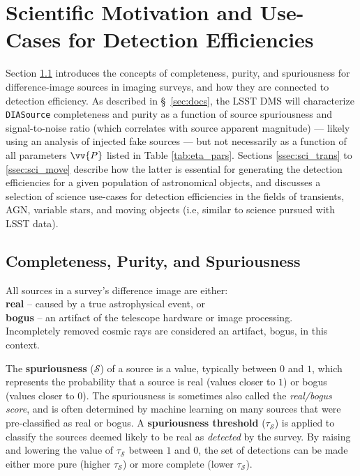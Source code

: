 \documentclass[DM,lsstdraft,toc]{lsstdoc}
\begin{document}
\section{Scientific Motivation and Use-Cases for Detection Efficiencies}\label{sec:sci}

Section \ref{ssec:sci_rb} introduces the concepts of completeness, purity, and spuriousness for difference-image sources in imaging surveys, and how they are connected to detection efficiency. As described in \S~\ref{sec:docs}, the LSST DMS will characterize {\tt DIASource} completeness and purity as a function of source spuriousness and signal-to-noise ratio (which correlates with source apparent magnitude) --- likely using an analysis of injected fake sources --- but not necessarily as a function of all parameters $\vv{P}$ listed in Table \ref{tab:eta_pars}. Sections \ref{ssec:sci_trans} to \ref{ssec:sci_move} describe how the latter is essential for generating the detection efficiencies for a given population of astronomical objects, and discusses a selection of science use-cases for detection efficiencies in the fields of transients, AGN, variable stars, and moving objects (i.e, similar to science pursued with LSST data). 

\subsection{Completeness, Purity, and Spuriousness}\label{ssec:sci_rb}

All sources in a survey's difference image are either: \\
\hspace*{10mm} {\bf real} -- caused by a true astrophysical event, or \\
\hspace*{10mm} {\bf bogus} -- an artifact of the telescope hardware or image processing. \\ 
Incompletely removed cosmic rays are considered an artifact, bogus, in this context. 

The {\bf spuriousness} ($\mathcal{S}$) of a source is a value, typically between $0$ and $1$, which represents the probability that a source is real (values closer to $1$) or bogus (values closer to $0$). The spuriousness is sometimes also called the {\it real/bogus score}, and is often determined by machine learning on many sources that were pre-classified as real or bogus. A {\bf spuriousness threshold} ($\tau_{\mathcal{S}}$) is applied to classify the sources deemed likely to be real as {\it detected} by the survey. By raising and lowering the value of $\tau_{\mathcal{S}}$ between $1$ and $0$, the set of detections can be made either more pure (higher $\tau_{\mathcal{S}}$) or more complete (lower $\tau_{\mathcal{S}}$). 
\end{document}
